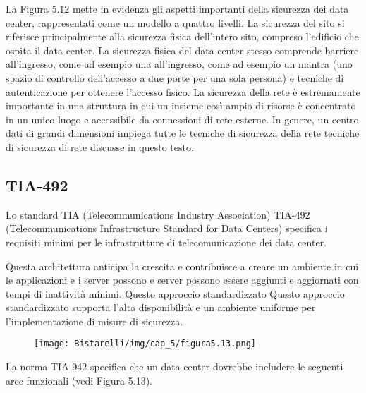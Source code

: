 La Figura 5.12 mette in evidenza gli aspetti importanti della sicurezza dei data center, rappresentati come un modello a quattro livelli. La sicurezza del sito si riferisce principalmente alla sicurezza fisica dell'intero sito, compreso l'edificio che ospita il data center. La sicurezza fisica del data center stesso comprende barriere all'ingresso, come ad esempio una all'ingresso, come ad esempio un mantra (uno spazio di controllo dell'accesso a due porte per una sola persona) e tecniche di autenticazione per ottenere l'accesso fisico. La sicurezza della rete è estremamente importante in una struttura in cui un insieme così ampio di risorse è concentrato in un unico luogo e accessibile da connessioni di rete esterne. In genere, un centro dati di grandi dimensioni impiega tutte le tecniche di sicurezza della rete tecniche di sicurezza di rete discusse in questo testo.
\subsection{TIA-492}
Lo standard TIA (Telecommunications Industry Association) TIA-492 (Telecommunications Infrastructure Standard for Data Centers) specifica i requisiti minimi per le infrastrutture di telecomunicazione dei data center. 

\singlespacing

Questa architettura anticipa la crescita e contribuisce a creare un ambiente in cui le applicazioni e i server possono
e server possono essere aggiunti e aggiornati con tempi di inattività minimi. Questo approccio standardizzato
Questo approccio standardizzato supporta l'alta disponibilità e un ambiente uniforme per l'implementazione di misure di sicurezza. 

\begin{figure}[H]
	\centering
    \texttt{[image: Bistarelli/img/cap\_5/figura5.13.png]}
\end{figure}

\singlespacing

La norma TIA-942 specifica che un data center dovrebbe includere le seguenti aree funzionali (vedi Figura 5.13).

